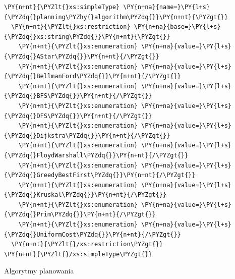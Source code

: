 \begin{program}
\begin{code}
\begin{Verbatim}[commandchars=\\\{\}]
\PY{n+nt}{\PYZlt{}xs:simpleType} \PY{n+na}{name=}\PY{l+s}{\PYZdq{}planning\PYZhy{}algorithm\PYZdq{}}\PY{n+nt}{\PYZgt{}}
  \PY{n+nt}{\PYZlt{}xs:restriction} \PY{n+na}{base=}\PY{l+s}{\PYZdq{}xs:string\PYZdq{}}\PY{n+nt}{\PYZgt{}}
    \PY{n+nt}{\PYZlt{}xs:enumeration} \PY{n+na}{value=}\PY{l+s}{\PYZdq{}AStar\PYZdq{}}\PY{n+nt}{/\PYZgt{}}
    \PY{n+nt}{\PYZlt{}xs:enumeration} \PY{n+na}{value=}\PY{l+s}{\PYZdq{}BellmanFord\PYZdq{}}\PY{n+nt}{/\PYZgt{}}
    \PY{n+nt}{\PYZlt{}xs:enumeration} \PY{n+na}{value=}\PY{l+s}{\PYZdq{}BFS\PYZdq{}}\PY{n+nt}{/\PYZgt{}}
    \PY{n+nt}{\PYZlt{}xs:enumeration} \PY{n+na}{value=}\PY{l+s}{\PYZdq{}DFS\PYZdq{}}\PY{n+nt}{/\PYZgt{}}
    \PY{n+nt}{\PYZlt{}xs:enumeration} \PY{n+na}{value=}\PY{l+s}{\PYZdq{}Dijkstra\PYZdq{}}\PY{n+nt}{/\PYZgt{}}
    \PY{n+nt}{\PYZlt{}xs:enumeration} \PY{n+na}{value=}\PY{l+s}{\PYZdq{}FloydWarshall\PYZdq{}}\PY{n+nt}{/\PYZgt{}}
    \PY{n+nt}{\PYZlt{}xs:enumeration} \PY{n+na}{value=}\PY{l+s}{\PYZdq{}GreedyBestFirst\PYZdq{}}\PY{n+nt}{/\PYZgt{}}
    \PY{n+nt}{\PYZlt{}xs:enumeration} \PY{n+na}{value=}\PY{l+s}{\PYZdq{}Kruskal\PYZdq{}}\PY{n+nt}{/\PYZgt{}}
    \PY{n+nt}{\PYZlt{}xs:enumeration} \PY{n+na}{value=}\PY{l+s}{\PYZdq{}Prim\PYZdq{}}\PY{n+nt}{/\PYZgt{}}
    \PY{n+nt}{\PYZlt{}xs:enumeration} \PY{n+na}{value=}\PY{l+s}{\PYZdq{}UniformCost\PYZdq{}}\PY{n+nt}{/\PYZgt{}}
  \PY{n+nt}{\PYZlt{}/xs:restriction\PYZgt{}}
\PY{n+nt}{\PYZlt{}/xs:simpleType\PYZgt{}}
\end{Verbatim}
\end{code}
\caption{Algorytmy planowania}
\end{program}


